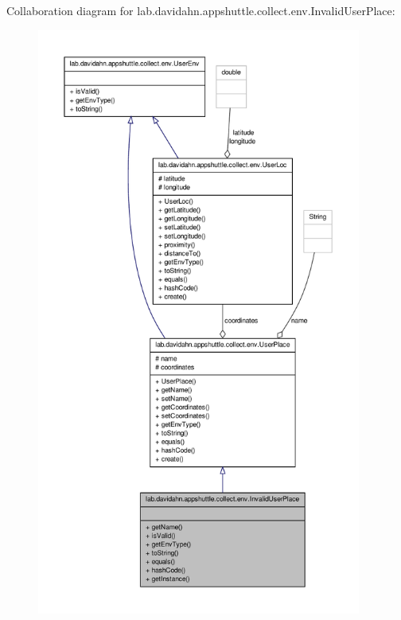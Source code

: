 \-Collaboration diagram for lab.\-davidahn.\-appshuttle.\-collect.\-env.\-Invalid\-User\-Place\-:
\nopagebreak
\begin{figure}[H]
\begin{center}
\leavevmode
\includegraphics[height=550pt]{classlab_1_1davidahn_1_1appshuttle_1_1collect_1_1env_1_1_invalid_user_place__coll__graph}
\end{center}
\end{figure}
